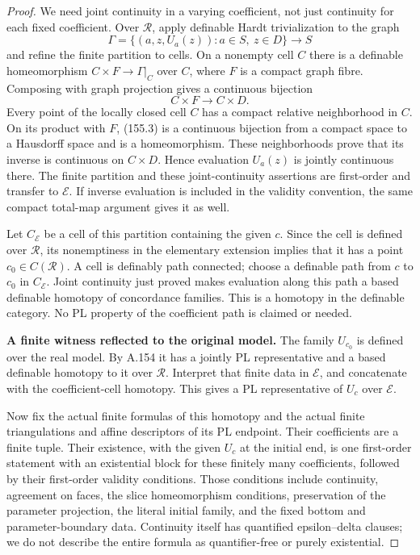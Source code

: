 \begin{proof}
We need joint continuity in a varying coefficient, not just
continuity for each fixed coefficient. Over \(\mathcal R\), apply
definable Hardt trivialization to the graph
\[
 \Gamma=\{(a,z,U_a(z)):a\in S,\ z\in D\}\longrightarrow S
\]
and refine the finite partition to cells. On a nonempty cell \(C\)
there is a definable homeomorphism
\(C\times F\to\Gamma|_C\) over \(C\), where \(F\) is a compact graph
fibre. Composing with graph projection gives a continuous bijection
\[
 C\times F\longrightarrow C\times D .
 \tag{155.3}
\]
Every point of the locally closed cell \(C\) has a compact relative
neighborhood in \(C\). On its product with \(F\), (155.3) is a
continuous bijection from a compact space to a Hausdorff space and
is a homeomorphism. These neighborhoods prove that its inverse is
continuous on \(C\times D\). Hence evaluation \(U_a(z)\) is jointly
continuous there. The finite partition and these joint-continuity
assertions are first-order and transfer to \(\mathcal E\).
If inverse evaluation is included in the validity convention, the
same compact total-map argument gives it as well.

Let \(C_{\mathcal E}\) be a cell of this partition containing the
given \(c\). Since the cell is defined over \(\mathcal R\), its
nonemptiness in the elementary extension implies that it has a point
\(c_0\in C(\mathcal R)\). A cell is definably path connected;
choose a definable path from \(c\) to \(c_0\) in \(C_{\mathcal E}\).
Joint continuity just proved makes evaluation along this path a
based definable homotopy of concordance families.
This is a homotopy in the definable category. No PL property of
the coefficient path is claimed or needed.

\textbf{A finite witness reflected to the original model.}\quad
The family \(U_{c_0}\) is defined over the real model.
By A.154 it has a jointly PL representative and a based definable
homotopy to it over \(\mathcal R\). Interpret that finite data in
\(\mathcal E\), and concatenate with the coefficient-cell homotopy.
This gives a PL representative of \(U_c\) over \(\mathcal E\).

Now fix the actual finite formulas of this homotopy and the actual
finite triangulations and affine descriptors of its PL endpoint.
Their coefficients are a finite tuple. Their existence, with the
given \(U_c\) at the initial end, is one first-order statement with
an existential block for these finitely many coefficients, followed
by their first-order validity conditions. Those conditions include
continuity, agreement on faces, the slice homeomorphism conditions,
preservation of the parameter projection, the literal initial
family, and the fixed bottom and parameter-boundary data.
Continuity itself has quantified epsilon--delta clauses; we do not
describe the entire formula as quantifier-free or purely existential.


\end{proof}
